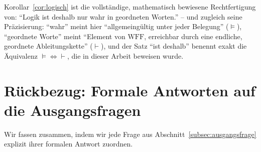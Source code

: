 \documentclass[12pt, a4paper]{article}
\theoremstyle{definition}
\theoremstyle{remark}
\newcommand{\WFF}{\mathrm{WFF}}
\begin{document}
Korollar~\ref{cor:logisch} ist die vollständige, mathematisch bewiesene Rechtfertigung von: ``Logik ist deshalb nur wahr in geordneten Worten.'' -- und zugleich seine Präzisierung: ``wahr'' meint hier ``allgemeingültig unter jeder Belegung'' ($\models$), ``geordnete Worte'' meint ``Element von $\WFF$, erreichbar durch eine endliche, geordnete Ableitungskette'' ($\vdash$), und der Satz ``ist deshalb'' benennt exakt die Äquivalenz $\models\Leftrightarrow\vdash$, die in dieser Arbeit beweisen wurde.

\section{Rückbezug: Formale Antworten auf die Ausgangsfragen}
\label{sec:rueckbezug}

Wir fassen zusammen, indem wir jede Frage aus Abschnitt~\ref{subsec:ausgangsfrage} explizit ihrer formalen Antwort zuordnen.
\end{document}
